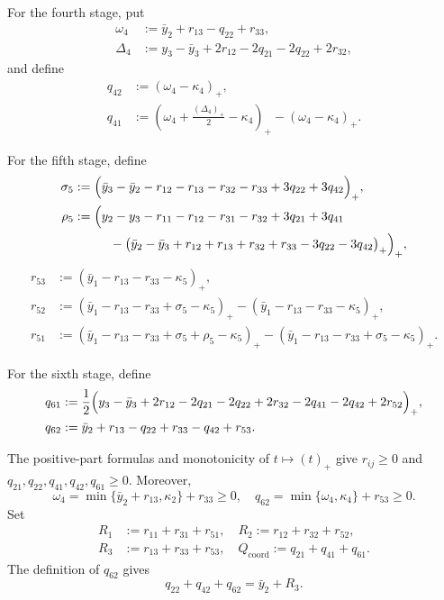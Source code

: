 \documentclass[11pt,reqno]{amsart}
\numberwithin{table}{section}
\numberwithin{equation}{section}
\theoremstyle{plain}
\theoremstyle{definition}
\begin{document}
For the fourth stage, put
\begin{align*}
	\omega_4
	&:=
	\bar y_2+r_{13}-q_{22}+r_{33},
	\\
	\Delta_4
	&:=
	y_3-\bar y_3
	+2r_{12}
	-2q_{21}-2q_{22}
	+2r_{32},
\end{align*}
and define
\begin{align*}
	q_{42}
	&:=
	(\omega_4-\kappa_4)_+,
	\\
	q_{41}
	&:=
	\left(
	\omega_4+\frac{(\Delta_4)_+}{2}-\kappa_4
	\right)_+
	-
	(\omega_4-\kappa_4)_+.
\end{align*}

For the fifth stage, define
\begin{align*}
	\sigma_5
	&:=
	\Bigl(
	\bar y_3-\bar y_2
	-r_{12}-r_{13}-r_{32}-r_{33}
	+3q_{22}+3q_{42}
	\Bigr)_+,
	\\
	\rho_5
	&:=
	\Bigl(
	y_2-y_3
	-r_{11}-r_{12}-r_{31}-r_{32}
	+3q_{21}+3q_{41}
	\\
	&\hspace{1cm}
	-
	\bigl(
	\bar y_2-\bar y_3
	+r_{12}+r_{13}+r_{32}+r_{33}
	-3q_{22}-3q_{42}
	\bigr)_+
	\Bigr)_+,
\end{align*}
\begin{align*}
	r_{53}
	&:=
	(\bar y_1-r_{13}-r_{33}-\kappa_5)_+,
	\\
	r_{52}
	&:=
	(\bar y_1-r_{13}-r_{33}+\sigma_5-\kappa_5)_+
	-
	(\bar y_1-r_{13}-r_{33}-\kappa_5)_+,
	\\
	r_{51}
	&:=
	(\bar y_1-r_{13}-r_{33}
	+\sigma_5+\rho_5-\kappa_5)_+
	-
	(\bar y_1-r_{13}-r_{33}
	+\sigma_5-\kappa_5)_+.
\end{align*}

For the sixth stage, define
\begin{align*}
	q_{61}
	&:=
	\frac12
	\Bigl(
	y_3-\bar y_3
	+2r_{12}
	-2q_{21}-2q_{22}
	+2r_{32}
	-2q_{41}-2q_{42}
	+2r_{52}
	\Bigr)_+,
	\\
	q_{62}
	&:=
	\bar y_2+r_{13}-q_{22}
	+r_{33}-q_{42}+r_{53}.
\end{align*}

The positive-part formulas and monotonicity of
\(t\mapsto(t)_+\) give \(r_{ij}\ge0\) and
\(q_{21},q_{22},q_{41},q_{42},q_{61}\ge0\).
Moreover,
\[
\omega_4
=
\min\{\bar y_2+r_{13},\kappa_2\}+r_{33}
\ge0,
\quad
q_{62}
=
\min\{\omega_4,\kappa_4\}+r_{53}
\ge0.
\]
Set
\begin{align*}
	R_1
	&:=
	r_{11}+r_{31}+r_{51},
	\quad
	R_2
	:=
	r_{12}+r_{32}+r_{52},
	\\
	R_3
	&:=
	r_{13}+r_{33}+r_{53},
	\quad
	Q_{\mathrm{coord}}
	:=
	q_{21}+q_{41}+q_{61}.
\end{align*}
The definition of \(q_{62}\) gives
\begin{equation}\label{eq:twelve-q2-total}
	q_{22}+q_{42}+q_{62}
	=
	\bar y_2+R_3.
\end{equation}
\end{document}
